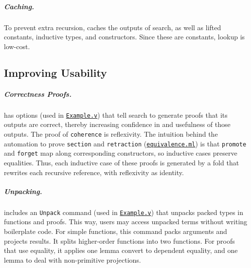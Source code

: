 \subparagraph*{Caching.} 
To prevent extra recursion, \toolnameb caches the outputs of search,
as well as lifted constants, inductive types, and constructors.
Since these are constants, lookup is low-cost.

\subsection{Improving Usability}
\label{sec:autouse}

\subparagraph*{Correctness Proofs.}
\toolnameb has options (used in \href{http://github.com/uwplse/ornamental-search/blob/itp+equiv/plugin/coq/examples/Example.v}{\lstinline{Example.v}}) that tell search to generate proofs that its outputs are correct, thereby increasing confidence in and
usefulness of those outputs.
The proof of \lstinline{coherence} is reflexivity.
The intuition behind 
the automation to prove \lstinline{section} and \lstinline{retraction} (\href{http://github.com/uwplse/ornamental-search/blob/itp+equiv/plugin/src/automation/equivalence.ml}{\lstinline{equivalence.ml}}) 
is that
\lstinline{promote} and \lstinline{forget} map along corresponding constructors, so inductive cases preserve equalities.
Thus, each inductive case of these proofs is generated by a fold that rewrites each recursive reference,
with reflexivity as identity.


\subparagraph*{Unpacking.}
\toolnameb includes an \lstinline{Unpack} command (used in \href{http://github.com/uwplse/ornamental-search/blob/itp+equiv/plugin/coq/examples/Example.v}{\lstinline{Example.v}})
that unpacks packed types in functions and proofs. 
This way, users may access unpacked terms without writing boilerplate code.
For simple functions, this command packs arguments and projects
results. It splits higher-order functions into two functions. For proofs that use equality, it applies 
one lemma convert to dependent equality, and one
lemma to deal with non-primitive projections.

